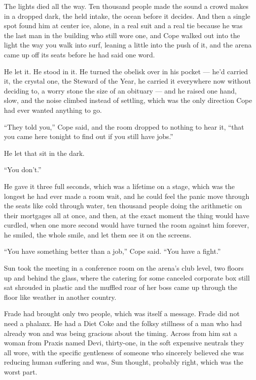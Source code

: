 \documentclass[11pt,openany]{book}
\newcommand{\scenebreak}{\par\vspace{0.5\baselineskip}\begin{center}\textasteriskcentered\quad\textasteriskcentered\quad\textasteriskcentered\end{center}\vspace{0.5\baselineskip}\par}
\begin{document}
The lights died all the way. Ten thousand people made the sound a crowd makes in a dropped dark, the held intake, the ocean before it decides. And then a single spot found him at center ice, alone, in a real suit and a real tie because he was the last man in the building who still wore one, and Cope walked out into the light the way you walk into surf, leaning a little into the push of it, and the arena came up off its seats before he had said one word.

He let it. He stood in it. He turned the obelisk over in his pocket --- he'd carried it, the crystal one, the Steward of the Year, he carried it everywhere now without deciding to, a worry stone the size of an obituary --- and he raised one hand, slow, and the noise climbed instead of settling, which was the only direction Cope had ever wanted anything to go.

``They told you,'' Cope said, and the room dropped to nothing to hear it, ``that you came here tonight to find out if you still have jobs.''

He let that sit in the dark.

``You don't.''

He gave it three full seconds, which was a lifetime on a stage, which was the longest he had ever made a room wait, and he could feel the panic move through the seats like cold through water, ten thousand people doing the arithmetic on their mortgages all at once, and then, at the exact moment the thing would have curdled, when one more second would have turned the room against him forever, he smiled, the whole smile, and let them see it on the screens.

``You have something better than a job,'' Cope said. ``You have a fight.''


\scenebreak


Sun took the meeting in a conference room on the arena's club level, two floors up and behind the glass, where the catering for some canceled corporate box still sat shrouded in plastic and the muffled roar of her boss came up through the floor like weather in another country.

Frade had brought only two people, which was itself a message. Frade did not need a phalanx. He had a Diet Coke and the folksy stillness of a man who had already won and was being gracious about the timing. Across from him sat a woman from Praxis named Devi, thirty-one, in the soft expensive neutrals they all wore, with the specific gentleness of someone who sincerely believed she was reducing human suffering and was, Sun thought, probably right, which was the worst part.
\end{document}

